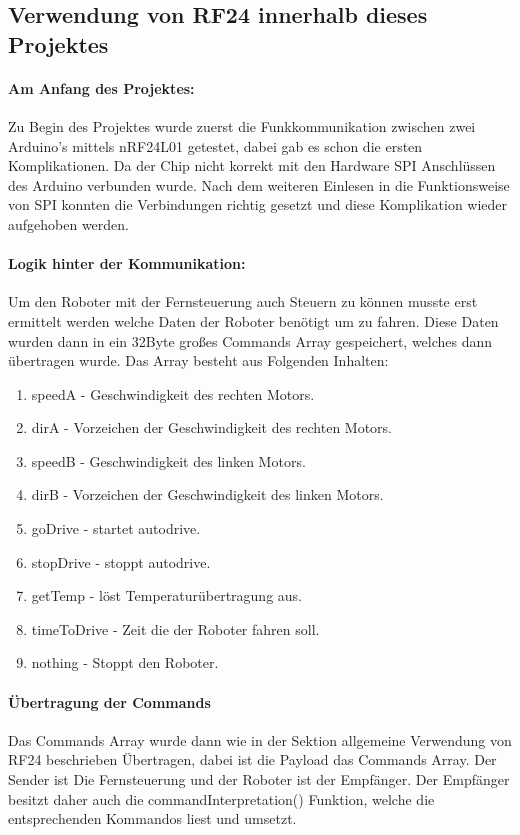\documentclass{article}
\begin{document}
	\subsection{Verwendung von RF24 innerhalb dieses Projektes}
	\paragraph{Am Anfang des Projektes: }
	Zu Begin des Projektes wurde zuerst die Funkkommunikation zwischen zwei Arduino's mittels nRF24L01 getestet, dabei gab es schon die ersten Komplikationen. Da der Chip nicht korrekt mit den Hardware SPI Anschlüssen des Arduino verbunden wurde. Nach dem weiteren Einlesen in die Funktionsweise von SPI konnten die Verbindungen richtig gesetzt und diese Komplikation wieder aufgehoben werden.
	\paragraph{Logik hinter der Kommunikation: }
	Um den Roboter mit der Fernsteuerung auch Steuern zu können musste erst ermittelt werden welche Daten der Roboter benötigt um zu fahren. Diese Daten wurden dann in ein 32Byte großes Commands Array gespeichert, welches dann übertragen wurde. Das Array besteht aus Folgenden Inhalten:
\begin{enumerate}
\item speedA      - Geschwindigkeit des rechten Motors. 
\item dirA        - Vorzeichen der Geschwindigkeit des rechten Motors.
\item speedB      - Geschwindigkeit des linken Motors.
\item dirB        - Vorzeichen der Geschwindigkeit des linken Motors.
\item goDrive     - startet autodrive.
\item stopDrive   - stoppt autodrive.
\item getTemp     - löst Temperaturübertragung aus.
\item timeToDrive - Zeit die der Roboter fahren soll.
\item nothing     - Stoppt den Roboter.
\end{enumerate}

\paragraph{Übertragung der Commands} 
Das Commands Array wurde dann wie in der Sektion allgemeine Verwendung von RF24 beschrieben Übertragen, dabei ist die Payload das Commands Array. Der Sender ist Die Fernsteuerung und der Roboter ist der Empfänger. Der Empfänger besitzt daher auch die commandInterpretation() Funktion, welche die entsprechenden Kommandos liest und umsetzt.
\end{document}
